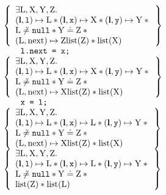\documentclass{article}
\begin{document}
{\begin{figure}
{\[\begin{array}{l}
        \left\{\begin{array}{l}
                \exists \V{L},\V{X},\V{Y},\V{Z}\st\\
                (\ls,\js{l})\pointsto\V{L}\sep(\ls,\js{x})\pointsto\V{X} \sep (\ls,\js{y})\pointsto\V{Y}\sep{}\\
                \V{L}\not\doteq\nil\sep\V{Y}\doteq\V{Z}\sep{}\\
                (\V{L},\text{next})\pointsto\V{Z}\text{list}(\V{Z}) \sep \text{list}(\V{X})
        \end{array}\right\}\\
        \qquad \js{l.next = x;}\\
        \left\{\begin{array}{l}
                \exists \V{L},\V{X},\V{Y},\V{Z}\st\\
                (\ls,\js{l})\pointsto\V{L}\sep(\ls,\js{x})\pointsto\V{X} \sep (\ls,\js{y})\pointsto\V{Y}\sep{}\\
                \V{L}\not\doteq\nil\sep\V{Y}\doteq\V{Z}\sep{}\\
                (\V{L},\text{next})\pointsto\V{X}\text{list}(\V{Z}) \sep \text{list}(\V{X})
        \end{array}\right\}\\
        \qquad \js{x = l;}\\
        \left\{\begin{array}{l}
                \exists \V{L},\V{X},\V{Y},\V{Z}\st\\
                (\ls,\js{l})\pointsto\V{L}\sep(\ls,\js{x})\pointsto\V{L} \sep (\ls,\js{y})\pointsto\V{Y}\sep{}\\
                \V{L}\not\doteq\nil\sep\V{Y}\doteq\V{Z}\sep{}\\
                (\V{L},\text{next})\pointsto\V{X}\text{list}(\V{Z}) \sep \text{list}(\V{X})
        \end{array}\right\}\\
        \left\{\begin{array}{l}
                \exists \V{L},\V{X},\V{Y},\V{Z}\st\\
                (\ls,\js{l})\pointsto\V{L}\sep(\ls,\js{x})\pointsto\V{L} \sep (\ls,\js{y})\pointsto\V{Y}\sep{}\\
                \V{L}\not\doteq\nil\sep\V{Y}\doteq\V{Z}\sep{}\\
                \text{list}(\V{Z}) \sep \text{list}(\V{L})
        \end{array}\right\}\\

\end{array}\]}
\end{figure}}
\end{document}
